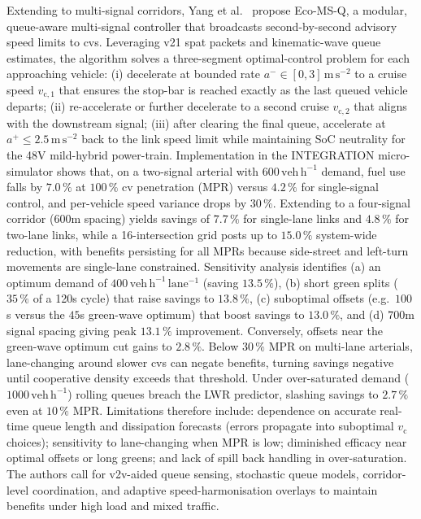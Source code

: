 \mynewline
Extending to multi-signal corridors, Yang et al.\ \cite{Yang2021} propose Eco-MS-Q, a modular, queue-aware multi-signal controller that broadcasts second-by-second advisory speed limits to \acp{cv}. Leveraging \ac{v21} \ac{spat} packets and kinematic-wave queue estimates, the algorithm solves a three-segment optimal-control problem for each approaching vehicle: (i) decelerate at bounded rate $a^{-}\!\in[0,3]\,\mathrm{m\,s^{-2}}$ to a cruise speed $v_{\mathrm c,1}$ that ensures the stop-bar is reached exactly as the last queued vehicle departs; (ii) re-accelerate or further decelerate to a second cruise $v_{\mathrm c,2}$ that aligns with the downstream signal; (iii) after clearing the final queue, accelerate at $a^{+}\!\le 2.5\,\mathrm{m\,s^{-2}}$ back to the link speed limit while maintaining \mbox{SoC} neutrality for the 48V mild-hybrid power-train. Implementation in the INTEGRATION micro-simulator shows that, on a two-signal arterial with $600\,\mathrm{veh\,h^{-1}}$ demand, fuel use falls by $7.0\,\%$ at $100\,\%$ \ac{cv} penetration (MPR) versus $4.2\,\%$ for single-signal control, and per-vehicle speed variance drops by $30\,\%$.  Extending to a four-signal corridor (600m spacing) yields savings of $7.7\,\%$ for single-lane links and $4.8\,\%$ for two-lane links, while a 16-intersection grid posts up to $15.0\,\%$ system-wide reduction, with benefits persisting for all MPRs because side-street and left-turn movements are single-lane constrained.  Sensitivity analysis identifies (a) an optimum demand of $400\,\mathrm{veh\,h^{-1}\,lane^{-1}}$ (saving $13.5\,\%$), (b) short green splits ($35\,\%$ of a 120s cycle) that raise savings to $13.8\,\%$, (c) suboptimal offsets (e.g.\ $100$s versus the $45$s green-wave optimum) that boost savings to $13.0\,\%$, and (d) $700$m signal spacing giving peak $13.1\,\%$ improvement. Conversely, offsets near the green-wave optimum cut gains to $2.8\,\%$.  Below $30\,\%$ MPR on multi-lane arterials, lane-changing around slower \acp{cv} can negate benefits, turning savings negative until cooperative density exceeds that threshold. Under over-saturated demand ($1000\,\mathrm{veh\,h^{-1}}$) rolling queues breach the LWR predictor, slashing savings to $2.7\,\%$ even at $10\,\%$ MPR.  Limitations therefore include: dependence on accurate real-time queue length and dissipation forecasts (errors propagate into suboptimal $v_{\mathrm c}$ choices); sensitivity to lane-changing when MPR is low; diminished efficacy near optimal offsets or long greens; and lack of spill back handling in over-saturation. The authors call for \ac{v2v}-aided queue sensing, stochastic queue models, corridor-level coordination, and adaptive speed-harmonisation overlays to maintain benefits under high load and mixed traffic.
